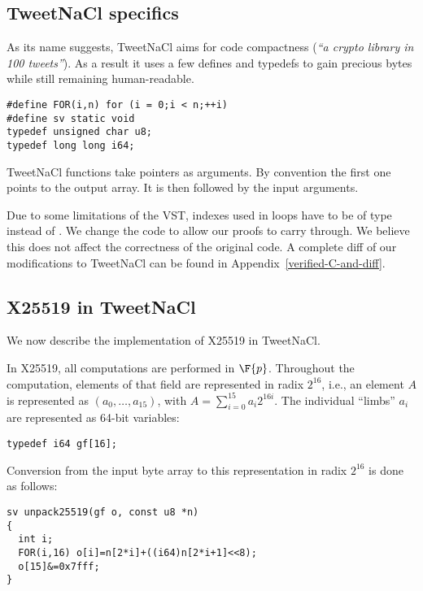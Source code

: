 \subsection{TweetNaCl specifics}
\label{subsec:Number-TweetNaCl}

As its name suggests, TweetNaCl aims for code compactness (\emph{``a crypto library in 100 tweets''}).
As a result it uses a few defines and typedefs to gain precious bytes while
still remaining human-readable.
\begin{lstlisting}[language=Ctweetnacl]
#define FOR(i,n) for (i = 0;i < n;++i)
#define sv static void
typedef unsigned char u8;
typedef long long i64;
\end{lstlisting}

TweetNaCl functions take pointers as arguments. By convention the first one
points to the output array. It is then followed by the input arguments.

Due to some limitations of the VST, indexes used in  loops have to be
of type  instead of . We change the code to allow our
proofs to carry through. We believe this does not affect the correctness of the
original code. A complete diff of our modifications to TweetNaCl can be found in
Appendix~\ref{verified-C-and-diff}.


\subsection{X25519 in TweetNaCl}
\label{subsec:X25519-TweetNaCl}

We now describe the implementation of X25519 in TweetNaCl.

In X25519, all computations are performed in $\F{p}$.
Throughout the computation, elements of that field
are represented in radix $2^{16}$,
i.e., an element $A$ is represented as $(a_0,\dots,a_{15})$,
with $A = \sum_{i=0}^{15}a_i2^{16i}$.
The individual ``limbs'' $a_i$ are represented as
64-bit  variables:
\begin{lstlisting}[language=Ctweetnacl]
typedef i64 gf[16];
\end{lstlisting}

Conversion from the input byte array to this representation in radix $2^{16}$ is
done as follows:
\begin{lstlisting}[language=Ctweetnacl]
sv unpack25519(gf o, const u8 *n)
{
  int i;
  FOR(i,16) o[i]=n[2*i]+((i64)n[2*i+1]<<8);
  o[15]&=0x7fff;
}
\end{lstlisting}

